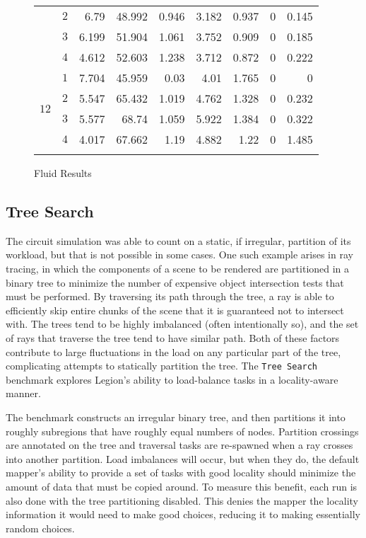 \begin{figure}
{\begin{tabular}{c@{\hspace{2pt}}cD{.}{.}{3}D{.}{.}{3}@{\hspace{2pt}}D{.}{.}{3}@{\hspace{2pt}}D{.}{.}{3}@{\hspace{2pt}}D{.}{.}{3}@{\hspace{2pt}}D{.}{.}{3}@{\hspace{2pt}}D{.}{.}{3}}
 & $2$ & 6.79 & 48.992 & 0.946 & 3.182 & 0.937 & 0 & 0.145\\
 & $3$ & 6.199 & 51.904 & 1.061 & 3.752 & 0.909 & 0 & 0.185\\
 & $4$ & 4.612 & 52.603 & 1.238 & 3.712 & 0.872 & 0 & 0.222\\
\midrule
{} & $1$ & 7.704 & 45.959 & 0.03 & 4.01 & 1.765 & 0 & 0\\
 & $2$ & 5.547 & 65.432 & 1.019 & 4.762 & 1.328 & 0 & 0.232\\
 & $3$ & 5.577 & 68.74 & 1.059 & 5.922 & 1.384 & 0 & 0.322\\
 & $4$ & 4.017 & 67.662 & 1.19 & 4.882 & 1.22 & 0 & 1.485\\
\bottomrule \\
    \end{tabular}
    \label{sfig:results2:timers}
  }

  \caption{Fluid Results}
\end{figure}


\subsection{Tree Search}

The circuit simulation was able to count on a static, if irregular,
partition of its workload, but that is not possible in some cases.  One
such example arises in ray tracing, in which the components of a scene to be
rendered are partitioned in a binary tree to minimize the number of expensive
object intersection tests that must be performed.  By traversing its path 
through the tree, a ray is able to efficiently skip entire chunks of the 
scene that it is guaranteed not to intersect with.  The trees tend to be
highly imbalanced (often intentionally so), and the set of rays that traverse
the tree tend to have similar path.  Both of these factors contribute to
large fluctuations in the load on any particular part of the tree, complicating
attempts to statically partition the tree.  The {\tt Tree Search} benchmark
explores Legion's ability to load-balance tasks in a locality-aware manner.

The benchmark constructs an irregular binary tree, and then partitions it into
roughly subregions that have roughly equal numbers of nodes.  Partition
crossings are annotated on the tree and traversal tasks are re-spawned when
a ray crosses into another partition.  Load imbalances will occur, but when
they do, the default mapper's ability to provide a set of tasks with good
locality should minimize the amount of data that must be copied around.  To
measure this benefit, each run is also done with the tree partitioning 
disabled.  This denies the mapper the locality information it would need to 
make good choices, reducing it to making essentially random choices.

